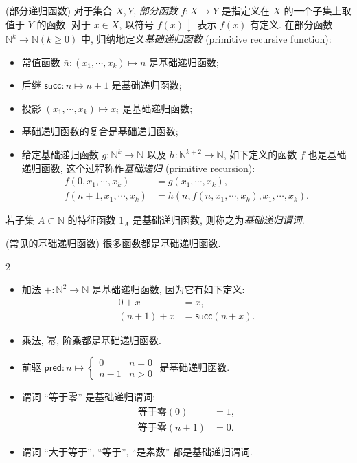 \begin{definition}
	{(部分递归函数)}
	对于集合 $X,Y$, \emph{部分函数} $f\colon X \to Y$ 是指定义在 $X$ 的一个子集上取值于 $Y$ 的函数. 对于 $x\in X$, 以符号 $f(x)\downarrow$ 表示 $f(x)$ 有定义.
	在部分函数 $\mathbb{N}^k \to \mathbb{N} (k\geq 0)$ 中, 归纳地定义\emph{基础递归函数} (primitive recursive function):
	\begin{itemize}
		\item 常值函数 $\bar n\colon (x_1,\cdots,x_k)\mapsto n$ 是基础递归函数;
		\item 后继 $\mathsf {succ} \colon n\mapsto n+1$ 是基础递归函数;
		\item 投影 $(x_1,\cdots,x_k)\mapsto x_i$ 是基础递归函数;
		\item 基础递归函数的复合是基础递归函数;
		\item 给定基础递归函数 $g\colon \mathbb{N}^k\to \mathbb{N}$ 以及 $h\colon \mathbb{N}^{k+2}\to\mathbb{N}$, 如下定义的函数 $f$ 也是基础递归函数, 这个过程称作\emph{基础递归} (primitive recursion):
		$$
		\begin{aligned}
			f(0,x_1,\cdots,x_k) &= g(x_1,\cdots,x_k),
			\\
			f(n+1,x_1,\cdots,x_k) &= h(n,f(n,x_1,\cdots,x_k),x_1,\cdots,x_k).
		\end{aligned}
		$$
	\end{itemize}
	若子集 $A\subset\mathbb{N}$ 的特征函数 $1_A$ 是基础递归函数, 则称之为\emph{基础递归谓词}.
\end{definition}

\begin{example}
	{(常见的基础递归函数)}
	很多函数都是基础递归函数.
	\begin{multicols}
		{2}
		\begin{itemize}
			\item 加法 $+\colon \mathbb{N}^2\to \mathbb{N}$ 是基础递归函数, 因为它有如下定义:
			$$
			\begin{aligned}
				0+x &= x,
				\\
				(n+1)+x &= \mathsf {succ}(n+x).
			\end{aligned}
			$$
			\item 乘法, 幂, 阶乘都是基础递归函数.
			\item 前驱 $\mathsf {pred}\colon n\mapsto
			\begin{cases}
				0 & n=0\\
				n-1 & n>0
			\end{cases}
			$ 是基础递归函数.
			\item 谓词 ``等于零'' 是基础递归谓词:
			$$
			\begin{aligned}
				\text{等于零}(0) &= 1,
				\\
				\text{等于零}(n+1) &= 0.
			\end{aligned}
			$$
			\item 谓词 ``大于等于'', ``等于'', ``是素数'' 都是基础递归谓词.
		\end{itemize}
	\end{multicols}
\end{example}

